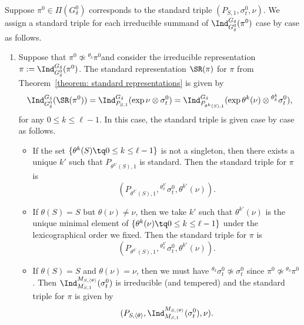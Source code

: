 \documentclass[11pt,letterpaper]{amsart}
\numberwithin{equation}{section}
\begin{document}
\begin{definition}\label{def: induction of standards to disconnected}
    Suppose $\pi^0 \in \Pi(G_{\delta}^0)$ corresponds to the standard triple $( P_{{S},1},  \sigma_t^0,  \nu )$. We assign a standard triple for each irreducible summand of $\Ind_{G^0_\delta}^{G_\delta}(\pi^0)$ case by case as follows.
\begin{enumerate}
 \item[Case 1.] 
 Suppose that $\pi^0\not\simeq {}^{\theta_{\delta}}{\pi^0}$and consider the irreducible representation $\pi:= \Ind_{G^0_{\delta}}^{G_{\delta}}(\pi^0)$. The standard representation $\SR(\pi)$ for $\pi$ from Theorem~\ref{theorem: standard representations} is given by
    \[ 
    \Ind_{G^0_\delta}^{G_\delta} ( \SR(\pi^0))= \Ind_{P_{{S},1}}^{G_\delta} (\exp \nu \otimes \sigma_t^0)=\Ind_{P_{\theta^k({S}),1}}^{G_\delta} (\exp \theta^k(\nu) \otimes {}^{\theta_{\delta}^k}\sigma_t^{0}),
    \]
    for any $0 \leq k \leq \ell-1$. 
    In this case, the standard triple is given case by case as follows.
    \begin{itemize}
        \item [(i)]
        If the set $ \{\theta^k({S}) \tq 0 \leq k \leq \ell-1\}$ is not a singleton, then there exists a unique $k'$ such that $P_{\theta^{k'}({S}),1}$ is standard. Then the standard triple for $\pi$ is 
        \[
        (P_{\theta^{k'}({S}),1},  {}^{\theta_{\delta}^{k'}}\sigma_t^0, \theta^{k'}(\nu)).
        \]
        \item [(ii)]  
        If $\theta ({S})={S}$ but $\theta(\nu) \neq \nu$, then we take $ k' $ such that $\theta^{k'}(\nu)$ is the unique minimal element of $\{ \theta^k(\nu) \tq 0 \leq k \leq \ell-1\}$ under the lexicographical order we fixed. Then the standard triple for $\pi$ is 
        \[
        (P_{\theta^{k'}({S}),1},  {}^{\theta_{\delta}^{k'}}\sigma_t^0, \theta^{k'}(\nu)).
        \]
        \item [(iii)] 
        If $\theta ({S})={S}$ and $\theta (\nu)=\nu$, then we must have ${}^{\theta_{\delta}}\sigma_t^0 \not\simeq \sigma_t^0$ since $\pi^0 \not\simeq {}^{\theta_{\delta}}{\pi}^0$. Then $\Ind_{M_{{S},1}}^{M_{{S}, \langle \theta \rangle}}(\sigma_t^0)$ is irreducible (and tempered) and the standard triple for $\pi$ is given by 
        \[
        (P_{{S},\langle \theta \rangle},  \Ind_{M_{{S},1}}^{M_{{S}, \langle \theta \rangle}}(\sigma_t^0) , \nu).
        \]
    \end{itemize}


\end{enumerate}
\end{definition}
\end{document}
